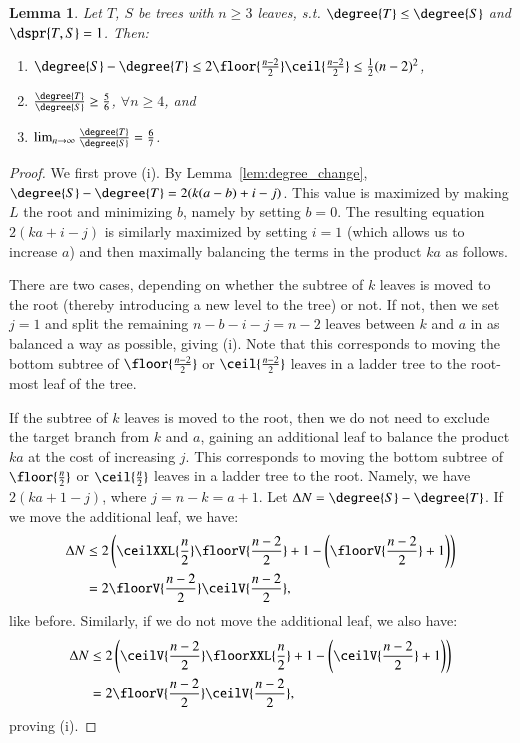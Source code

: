 \documentclass[]{elsarticle}
\newtheorem{lem}[thm]{Lemma}
\begin{document}
\begin{lem}
	\label{lem:degree_max_delta_adjacent}
	Let $T$, $S$ be trees with $n \ge 3$ leaves, s.t. $\degree{T} \le \degree{S}$ and $\dspr{T,S} = 1$.
	Then:
	\begin{enumerate}
		\item $\degree{S} - \degree{T} \le 2\floor{\frac{n-2}{2}}\ceil{\frac{n-2}{2}} \le \frac{1}{2} (n-2)^2 $,
		\item $\frac{\degree{T}}{\degree{S}} \ge \frac{5}{6}$, $\forall n \ge 4$, and
		\item $\lim_{n\rightarrow\infty}\frac{\degree{T}}{\degree{S}} =  \frac{6}{7}$.
	\end{enumerate}
\end{lem}
\begin{proof}
	We first prove (i).
	By Lemma~\ref{lem:degree_change}, $\degree{S} - \degree{T} = 2(k(a-b) + i - j)$.
	This value is maximized by making $L$ the root and minimizing $b$, namely by setting $b=0$.
	The resulting equation $2(ka + i - j)$ is similarly maximized by setting $i=1$ (which allows us to increase $a$) and then maximally balancing the terms in the product $ka$ as follows.

	There are two cases, depending on whether the subtree of $k$ leaves is moved to the root (thereby introducing a new level to the tree) or not.
    If not, then we set $j=1$ and split the remaining $n-b-i-j = n-2$ leaves between $k$ and $a$ in as balanced a way as possible, giving (i).
	Note that this corresponds to moving the bottom subtree of $\floor{\frac{n-2}{2}}$ or $\ceil{\frac{n-2}{2}}$ leaves in a ladder tree to the root-most leaf of the tree.

	If the subtree of $k$ leaves is moved to the root, then we do not need to exclude the target branch from $k$ and $a$, gaining an additional leaf to balance the product $ka$ at the cost of increasing $j$.
	This corresponds to moving the bottom subtree of $\floor{\frac{n}{2}}$ or $\ceil{\frac{n}{2}}$ leaves in a ladder tree to the root.
	Namely, we have $2(ka + 1 - j)$, where $j = n - k = a + 1$.
	Let ${\Delta}N = \degree{S} - \degree{T}$.
	If we move the additional leaf, we have:
	\begin{align*}
		{\Delta}N &\le 2\left(\ceilXXL{\frac{n}{2}}\floorV{\frac{n-2}{2}}  + 1 - \left(\floorV{\frac{n-2}{2}} + 1\right)\right) \\
		&= 2\floorV{\frac{n-2}{2}}\ceilV{\frac{n-2}{2}},
	\end{align*}
like before.
Similarly, if we do not move the additional leaf, we also have:
\begin{align*}
	{\Delta}N &\le 2 \left(\ceilV{\frac{n-2}{2}}\floorXXL{\frac{n}{2}} +1 -  \left(\ceilV{\frac{n-2}{2}} + 1\right)\right) \\
&= 2\floorV{\frac{n-2}{2}}\ceilV{\frac{n-2}{2}},
\end{align*}
proving (i).


\end{proof}
\end{document}
